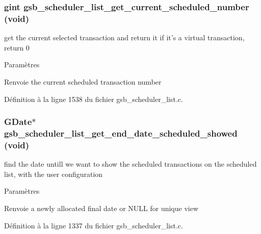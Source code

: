\subsubsection[{gsb\_\-scheduler\_\-list\_\-get\_\-current\_\-scheduled\_\-number}]{\setlength{\rightskip}{0pt plus 5cm}gint gsb\_\-scheduler\_\-list\_\-get\_\-current\_\-scheduled\_\-number (void)}\label{gsb__scheduler__list_8h_a52c8fea240a34ec37da7fe33460d06e7}
get the current selected transaction and return it if it's a virtual transaction, return 0


\begin{DoxyParams}{Paramètres}
\item[{\em }]\end{DoxyParams}
\begin{DoxyReturn}{Renvoie}
the current scheduled transaction number 
\end{DoxyReturn}


Définition à la ligne 1538 du fichier gsb\_\-scheduler\_\-list.c.

\subsubsection[{gsb\_\-scheduler\_\-list\_\-get\_\-end\_\-date\_\-scheduled\_\-showed}]{\setlength{\rightskip}{0pt plus 5cm}GDate$\ast$ gsb\_\-scheduler\_\-list\_\-get\_\-end\_\-date\_\-scheduled\_\-showed (void)}\label{gsb__scheduler__list_8h_ad9e65bbbb35121bbbb743a902b3632e9}
find the date untill we want to show the scheduled transactions on the scheduled list, with the user configuration


\begin{DoxyParams}{Paramètres}
\item[{\em }]\end{DoxyParams}
\begin{DoxyReturn}{Renvoie}
a newly allocated final date or NULL for unique view 
\end{DoxyReturn}


Définition à la ligne 1337 du fichier gsb\_\-scheduler\_\-list.c.

